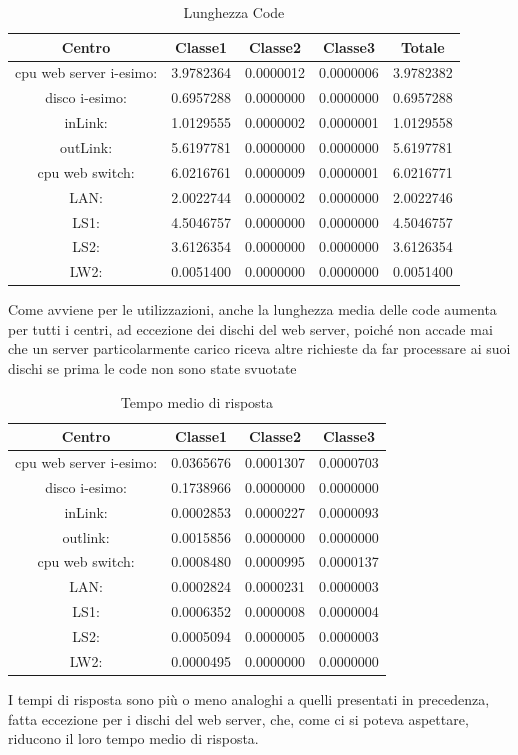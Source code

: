 \begin{table}[htbp]
\begin{center}
\begin{tabular}{||c|c|c|c|c||}
\hline
Centro &Classe1 &Classe2 &Classe3 &Totale\\
\hline
\hline
 cpu web server i-esimo: 	&3.9782364	&0.0000012	&0.0000006	&3.9782382\\
\hline
 disco i-esimo: 	&0.6957288	&0.0000000	&0.0000000	&0.6957288\\
\hline
 inLink: 	&1.0129555	&0.0000002	&0.0000001	&1.0129558\\
\hline
 outLink: 	&5.6197781	&0.0000000	&0.0000000	&5.6197781\\
\hline
 cpu web switch: 	&6.0216761	&0.0000009	&0.0000001	&6.0216771\\
\hline
 LAN: 	&2.0022744	&0.0000002	&0.0000000	&2.0022746\\
\hline
 LS1: 	&4.5046757	&0.0000000	&0.0000000	&4.5046757\\
\hline
 LS2: 	&3.6126354	&0.0000000	&0.0000000	&3.6126354\\
\hline
 LW2: 	&0.0051400	&0.0000000	&0.0000000	&0.0051400\\
\hline
\end{tabular}
\end{center}
\caption{Lunghezza Code}
\label{lunghezzacode}
\end{table}
Come avviene per le utilizzazioni, anche la lunghezza media delle code aumenta per tutti i centri, ad eccezione dei dischi del web server, poiché non accade mai che un server particolarmente carico riceva altre richieste da far processare ai suoi dischi se prima le code non sono state svuotate
\begin{table}[htbp]
\begin{center}
\begin{tabular}{||c|c|c|c||}
\hline
Centro &Classe1 &Classe2 &Classe3\\
\hline
\hline
 cpu web server i-esimo: 	&0.0365676	&0.0001307	&0.0000703\\
\hline
 disco i-esimo: 	&0.1738966	&0.0000000	&0.0000000\\
\hline
 inLink: 	&0.0002853	&0.0000227	&0.0000093\\
\hline
 outlink: 	&0.0015856	&0.0000000	&0.0000000\\
\hline
 cpu web switch: 	&0.0008480	&0.0000995	&0.0000137\\
\hline
 LAN: 	&0.0002824	&0.0000231	&0.0000003\\
\hline
 LS1: 	&0.0006352	&0.0000008	&0.0000004\\
\hline
 LS2: 	&0.0005094	&0.0000005	&0.0000003\\
\hline
 LW2: 	&0.0000495	&0.0000000	&0.0000000\\
\hline
\end{tabular}
\end{center}
\caption{Tempo medio di risposta}
\label{tempomediodirisposta}
\end{table}
I tempi di risposta sono più o meno analoghi a quelli presentati in precedenza, fatta eccezione per i dischi del web server, che, come ci si poteva aspettare, riducono il loro tempo medio di risposta.

